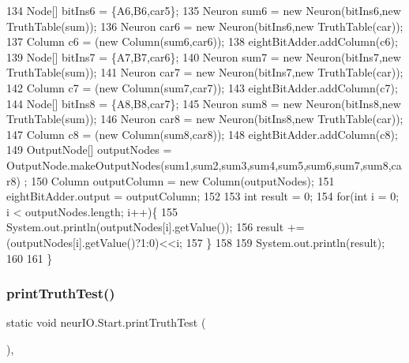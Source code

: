 \begin{DoxyCode}
134         Node[] bitIns6 = \{A6,B6,car5\};
135         Neuron sum6 = \textcolor{keyword}{new} Neuron(bitIns6,\textcolor{keyword}{new} TruthTable(sum));
136         Neuron car6 = \textcolor{keyword}{new} Neuron(bitIns6,\textcolor{keyword}{new} TruthTable(car));
137         Column c6 = (\textcolor{keyword}{new} Column(sum6,car6));
138         eightBitAdder.addColumn(c6);
139         Node[] bitIns7 = \{A7,B7,car6\};
140         Neuron sum7 = \textcolor{keyword}{new} Neuron(bitIns7,\textcolor{keyword}{new} TruthTable(sum));
141         Neuron car7 = \textcolor{keyword}{new} Neuron(bitIns7,\textcolor{keyword}{new} TruthTable(car));
142         Column c7 = (\textcolor{keyword}{new} Column(sum7,car7));
143         eightBitAdder.addColumn(c7);
144         Node[] bitIns8 = \{A8,B8,car7\};
145         Neuron sum8 = \textcolor{keyword}{new} Neuron(bitIns8,\textcolor{keyword}{new} TruthTable(sum));
146         Neuron car8 = \textcolor{keyword}{new} Neuron(bitIns8,\textcolor{keyword}{new} TruthTable(car));
147         Column c8 = (\textcolor{keyword}{new} Column(sum8,car8));
148         eightBitAdder.addColumn(c8);
149         OutputNode[] outputNodes = OutputNode.makeOutputNodes(sum1,sum2,sum3,sum4,sum5,sum6,sum7,sum8,car8)
      ;
150         Column outputColumn = \textcolor{keyword}{new} Column(outputNodes);
151         eightBitAdder.output = outputColumn;
152         
153         \textcolor{keywordtype}{int} result = 0;
154         \textcolor{keywordflow}{for}(\textcolor{keywordtype}{int} i = 0; i < outputNodes.length; i++)\{
155             System.out.println(outputNodes[i].getValue());
156             result +=(outputNodes[i].getValue()?1:0)<<i;
157         \}
158         
159         System.out.println(result);
160         
161     \}
\end{DoxyCode}
\mbox{\label{classneur_i_o_1_1_start_aedb59a7fabe14787e4d792a87bb23c7b}} 
\subsubsection{\texorpdfstring{print\+Truth\+Test()}{printTruthTest()}}
{\footnotesize\ttfamily static void neur\+I\+O.\+Start.\+print\+Truth\+Test (\begin{DoxyParamCaption}{ }\end{DoxyParamCaption})\hspace{0.3cm}{\ttfamily [static]}, {\ttfamily [private]}}

